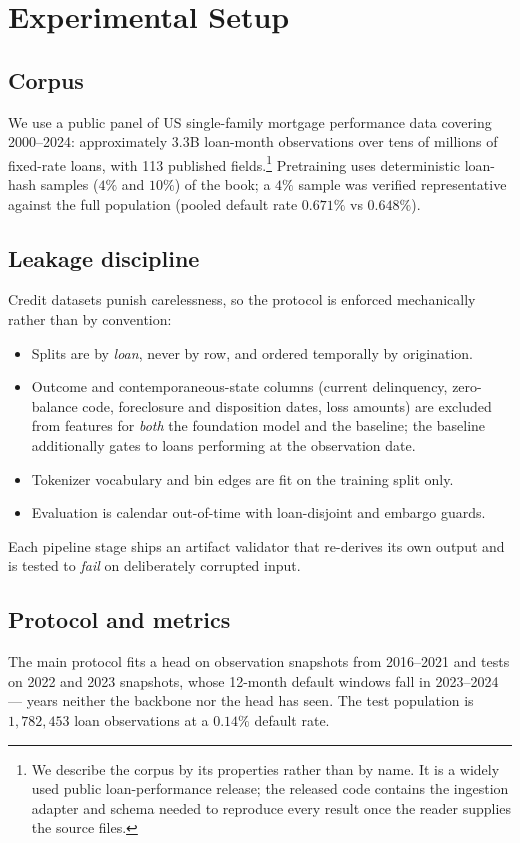 \documentclass[10pt,letterpaper]{article}
\begin{document}
\section{Experimental Setup}
\label{sec:setup}

\subsection{Corpus}
We use a public panel of US single-family mortgage performance data covering 2000--2024:
approximately $3.3$B loan-month observations over tens of millions of fixed-rate loans, with 113
published fields.\footnote{We describe the corpus by its properties rather than by name. It is a
widely used public loan-performance release; the released code contains the ingestion adapter and
schema needed to reproduce every result once the reader supplies the source files.} Pretraining
uses deterministic loan-hash samples ($4\%$ and $10\%$) of the book; a $4\%$ sample was verified
representative against the full population (pooled default rate $0.671\%$ vs $0.648\%$).

\subsection{Leakage discipline}
Credit datasets punish carelessness, so the protocol is enforced mechanically rather than by
convention:
\begin{itemize}
  \item Splits are by \emph{loan}, never by row, and ordered temporally by origination.
  \item Outcome and contemporaneous-state columns (current delinquency, zero-balance code,
        foreclosure and disposition dates, loss amounts) are excluded from features for
        \emph{both} the
        foundation model and the baseline; the baseline additionally gates to loans performing at
        the observation date.
  \item Tokenizer vocabulary and bin edges are fit on the training split only.
  \item Evaluation is calendar out-of-time with loan-disjoint and embargo guards.
\end{itemize}
Each pipeline stage ships an artifact validator that re-derives its own output and is tested to
\emph{fail} on deliberately corrupted input.

\subsection{Protocol and metrics}
The main protocol fits a head on observation snapshots from 2016--2021 and tests on 2022 and 2023
snapshots, whose 12-month default windows fall in 2023--2024 --- years neither the backbone nor the
head has seen. The test population is $1{,}782{,}453$ loan observations at a $0.14\%$ default rate.
\end{document}

